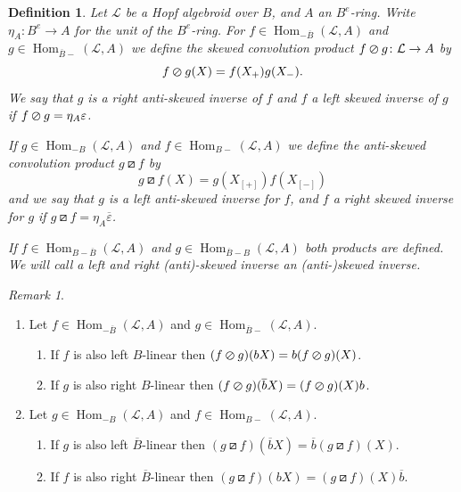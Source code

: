 \documentclass[a4paper,reqno]{amsart}
\DeclareMathOperator{\Hom}{Hom}
\numberwithin{equation}{section}
\theoremstyle{plain}
\newtheorem{defi}[thm]{Definition}
\theoremstyle{remark}
\newtheorem{rem}[thm]{Remark}
\numberwithin{equation}{section}
\newcommand\ol{\overline}
\newcommand{\CL}{\mathcal{L}}
\newcommand\skpr{\varoslash}
\newcommand\askpr{\boxslash}
\begin{document}
\begin{defi}
Let $\CL$ be a Hopf algebroid over $B$, and $A$ an $B^e$-ring. Write $\eta_A\colon B^e\to A$ for the unit of the $B^e$-ring.
For $f\in\Hom_{-\ol B}(\CL,A)$ and $g\in\Hom_{\ol B-}(\CL,A)$ we define the skewed convolution product $f\skpr g\colon\CL\to A$ by
\[f\skpr g(X)=f(X_+)g(X_-).\]
We say that $g$ is a right anti-skewed inverse of $f$ and $f$ a left skewed inverse of $g$ if $f\skpr g=\eta_A\varepsilon$.

If $g\in \Hom_{-B}(\CL,A)$ and $f\in\Hom_{B-}(\CL,A)$ we define the anti-skewed convolution product $g\askpr f$ by
\[g\askpr f(X)=g(X_{[+]})f(X_{[-]})\]
and we say that $g$ is a  left anti-skewed inverse for $f$, and $f$ a right skewed inverse for $g$ if $g\askpr f=\eta_A\ol\varepsilon$.

If $f\in\Hom_{B-\ol B}(\CL,A)$ and $g\in\Hom_{\ol B-B}(\CL,A)$ both products are defined. We will call a left and right (anti)-skewed inverse an (anti-)skewed inverse.
\end{defi}
\begin{rem}
\begin{enumerate}
    \item   Let $f\in\Hom_{-\ol B}(\CL,A)$ and $g\in\Hom_{\ol B-}(\CL,A).$
    \begin{enumerate}
        \item If $f$ is also left $B$-linear then $(f\skpr g)(bX)=b(f\skpr g)(X)$.
        \item If $g$ is also right $B$-linear then $(f\skpr g)(\ol bX)=(f\skpr g)(X)b$.
    \end{enumerate}
    \item Let $g\in \Hom_{-B}(\CL,A)$ and $f\in\Hom_{B-}(\CL,A)$.
    \begin{enumerate}
        \item If $g$ is also left $\ol B$-linear then $(g\askpr f)(\ol bX)=\ol b(g\askpr f)(X)$.
        \item If $f$ is also right $\ol B$-linear then $(g\askpr f)(bX)=(g\askpr f)(X)\ol b$.
    \end{enumerate}
\end{enumerate}
  
\end{rem}\label{rem. classical explaination}
\end{document}
